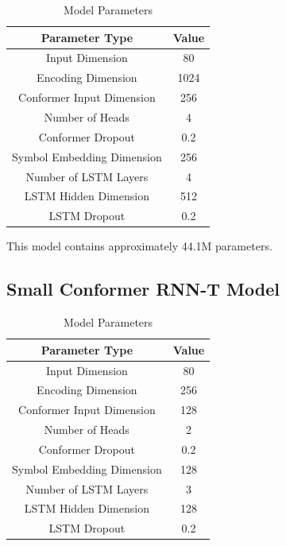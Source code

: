 \documentclass[9pt,final,a4paper]{IEEEtran}
\begin{document}
\begin{table}[H]
    \caption*{Model Parameters}
    \vspace*{-3mm}
    \begin{center}
        \begin{tabular}{|c|c|}
            \hline
            Parameter Type & Value \\ [0.5ex] 
            \hline\hline
            Input Dimension & 80 \\
            \hline
            Encoding Dimension & 1024 \\
            \hline
            Conformer Input Dimension & 256 \\
            \hline
            Number of Heads & 4 \\
            \hline
            Conformer Dropout & 0.2 \\
            \hline
            Symbol Embedding Dimension & 256 \\
            \hline
            Number of LSTM Layers & 4 \\
            \hline
            LSTM Hidden Dimension & 512 \\
            \hline
            LSTM Dropout & 0.2 \\
            \hline
        \end{tabular}
    \end{center}
\end{table}

This model contains approximately 44.1M parameters.

\subsection{Small Conformer RNN-T Model}

\begin{table}[H]
    \caption*{Model Parameters}
    \vspace*{-3mm}
    \begin{center}
        \begin{tabular}{|c|c|}
            \hline
            Parameter Type & Value \\ [0.5ex] 
            \hline\hline
            Input Dimension & 80 \\
            \hline
            Encoding Dimension & 256 \\
            \hline
            Conformer Input Dimension & 128 \\
            \hline
            Number of Heads & 2 \\
            \hline
            Conformer Dropout & 0.2 \\
            \hline
            Symbol Embedding Dimension & 128 \\
            \hline
            Number of LSTM Layers & 3 \\
            \hline
            LSTM Hidden Dimension & 128 \\
            \hline
            LSTM Dropout & 0.2 \\
            \hline
        \end{tabular}
    \end{center}
\end{table}
\end{document}
